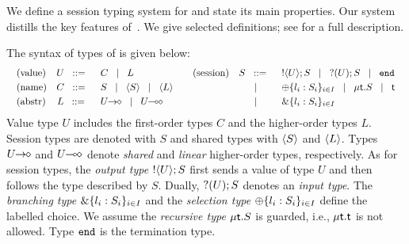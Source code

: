 \noi %
We define a session typing system for \HOp and state its main properties. 
Our system distills the key features of~\cite{tlca07,MostrousY15}.
We give selected definitions; 
see  for a full description. 


\smallskip 

The syntax of types of \HOp is given below:
\[
	\begin{array}{cc}
		\begin{array}{lcl}
			\text{(value)} & U \bnfis & C \bnfbar L
			\\[1mm]
			\text{(name)} & C \bnfis & S \bnfbar \chtype{S} \bnfbar \chtype{L}
			\\[1mm]
			\text{(abstr)} & L \bnfis & \shot{U} \bnfbar \lhot{U}
		\end{array}
		&
		\begin{array}{lcl}
			\text{(session)} & S \bnfis &  \btout{U} S \bnfbar \btinp{U} S \bnfbar \tinact
			\\[1mm]
			&\bnfbar& \btsel{l_i:S_i}_{i \in I} \bnfbar \trec{t}{S} \bnfbar \vart{t}
			\\[1mm]
			&\bnfbar& \btbra{l_i:S_i}_{i \in I}
		\end{array}
	\end{array}
	\]
Value type $U$ includes
the first-order types $C$ and the higher-order
types $L$. Session types are denoted with $S$ and
shared types with $\langle S \rangle$ and $\langle L \rangle$.
Types $U\!\! \rightarrow\!\! \diamond$ and $U\!\! \multimap\!\! \diamond$ denote
{\em shared} and {\em linear} higher-order 
types, respectively.
As for session types,  
the {\em output type}
$! \langle U \rangle ; S$ %
first sends a value of
type $U$ and then follows the type described by $S$.  Dually,
$? (U) ; S$ denotes an {\em input type}. The {\em branching type}
$\& \{l_i:S_i\}_{i \in I}$ and the {\em selection type}
$\oplus \{l_i:S_i\}_{i \in I}$ define the labelled choice. 
We assume the {\em recursive type} $\mu\mathsf{t}.S$ is guarded,
i.e.,  $\mu\mathsf{t}.\mathsf{t}$ is not allowed. 
Type $\mathtt{end}$ is the termination type. 

